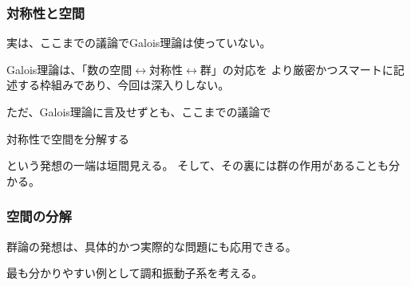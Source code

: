 \documentclass[12pt, t]{beamer}
\begin{document}
\begin{frame}
\frametitle{対称性と空間}
実は、ここまでの議論でGalois理論は\alert{使っていない}。

Galois理論は、「数の空間$\leftrightarrow$対称性$\leftrightarrow$群」の対応を
より厳密かつスマートに記述する枠組みであり、今回は深入りしない。

ただ、Galois理論に言及せずとも、ここまでの議論で
\begin{center}
対称性で空間を分解する
\end{center}
という発想の一端は垣間見える。
そして、その裏には群の作用があることも分かる。
\end{frame}

\begin{frame}
\frametitle{空間の分解}
群論の発想は、具体的かつ実際的な問題にも応用できる。

最も分かりやすい例として調和振動子系を考える。
\end{frame}
\end{document}
